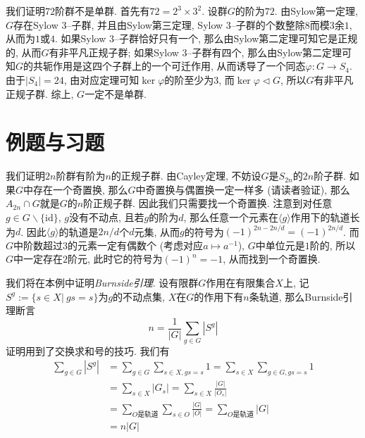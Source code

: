 \begin{eg}
    我们证明$72$阶群不是单群.
    首先有$72=2^3\times 3^2$.
    设群$G$的阶为$72$.
    由Sylow第一定理, $G$存在Sylow $3$--子群, 并且由Sylow第三定理, Sylow $3$--子群的个数整除$8$而模$3$余$1$, 从而为$1$或$4$.
    如果Sylow $3$--子群恰好只有一个, 那么由Sylow第二定理可知它是正规的, 从而$G$有非平凡正规子群;
    如果Sylow $3$--子群有四个, 那么由Sylow第二定理可知$G$的共轭作用是这四个子群上的一个可迁作用, 从而诱导了一个同态$\varphi:G\to S_4$.
    由于$|S_4|=24$, 由对应定理可知$\ker\varphi$的阶至少为$3$, 而$\ker\varphi\lhd G$, 所以$G$有非平凡正规子群.
    综上, $G$一定不是单群.
\end{eg}

\section{例题与习题}

\begin{eg}
    我们证明$2n$阶群有阶为$n$的正规子群.
    由Cayley定理, 不妨设$G$是$S_{2n}$的$2n$阶子群.
    如果$G$中存在一个奇置换, 那么$G$中奇置换与偶置换一定一样多 (请读者验证), 那么$A_{2n}\cap G$就是$G$的$n$阶正规子群.
    因此我们只需要找一个奇置换.
    注意到对任意$g\in G\backslash\{\mathrm{id}\}$, $g$没有不动点, 且若$g$的阶为$d$, 那么任意一个元素在$\langle g\rangle$作用下的轨道长为$d$.
    因此$\langle g\rangle$的轨道是$2n/d$个$d$元集, 从而$g$的符号为$(-1)^{2n-2n/d}=(-1)^{2n/d}$.
    而$G$中阶数超过$3$的元素一定有偶数个 (考虑对应$a\mapsto a^{-1}$), $G$中单位元是$1$阶的, 所以$G$中一定存在$2$阶元, 此时它的符号为$(-1)^n=-1$, 从而找到一个奇置换.
\end{eg}

\begin{eg}
    我们将在本例中证明\textit{Burnside引理}.
    设有限群$G$作用在有限集合$X$上, 记$S^g:=\{s\in X|\ gs=s\}$为$g$的不动点集, $X$在$G$的作用下有$n$条轨道, 那么Burnside引理断言
    \[n=\frac{1}{|G|}\sum_{g\in G}|S^g|\]
    证明用到了交换求和号的技巧.
    我们有
    \begin{align*}
        \sum_{g\in G}|S^g|&=\sum_{g\in G}\sum_{s\in X,gs=s}1=\sum_{s\in X}\sum_{g\in G,gs=s}1\\
        &=\sum_{s\in X}|G_s|=\sum_{s\in X}\frac{|G|}{|O_s|}\\
        &=\sum_{O\text{是轨道}}\sum_{s\in O}\frac{|G|}{|O|}=\sum_{O\text{是轨道}}|G|\\
        &=n|G|
    \end{align*}
\end{eg}

